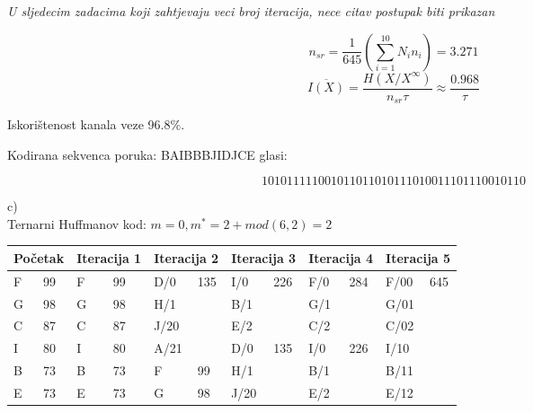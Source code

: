 \documentclass[12pt]{article}
\begin{document}
\textit{U sljedecim zadacima koji zahtjevaju veci broj iteracija, nece citav postupak biti prikazan}

$$n_{sr} = \frac{1}{645} (\sum_{i = 1}^{10} N_i n_i) = 3.271$$
$$\overline{I(X)} = \frac{H(X/X^{\infty}) }{n_{sr} \tau} \approx \frac{0.968}{\tau}$$

Iskorištenost kanala veze 96.8\%.

Kodirana sekvenca poruka: BAIBBBJIDJCE glasi:

$$101011111001011011010111010011101110010110$$

c)\\

Ternarni Huffmanov kod: $m = 0, m^{*} = 2 + mod(6, 2) = 2$

\begin{table}[hp]
\centering
\begin{tabular}{|l|l|l|l|l|l|l|l|l|l|l|l|}
\hline
\multicolumn{2}{|l|}{Početak} & \multicolumn{2}{l|}{Iteracija 1} & \multicolumn{2}{l|}{Iteracija 2} & \multicolumn{2}{l|}{Iteracija 3} & \multicolumn{2}{l|}{Iteracija 4} & \multicolumn{2}{l|}{Iteracija 5} \\ \hline
F             & 99            & F       & 99                     & D/0     & \multirow{4}{*}{135}   & I/0     & \multirow{3}{*}{226}   & F/0     & \multirow{3}{*}{284}   & F/00    & \multirow{10}{*}{645}  \\ \cline{1-4}
G             & 98            & G       & 98                     & H/1     &                        & B/1     &                        & G/1     &                        & G/01    &                        \\ \cline{1-4}
C             & 87            & C       & 87                     & J/20    &                        & E/2     &                        & C/2     &                        & C/02    &                        \\ \cline{1-4} \cline{7-10}
I             & 80            & I       & 80                     & A/21    &                        & D/0     & \multirow{4}{*}{135}   & I/0     & \multirow{3}{*}{226}   & I/10    &                        \\ \cline{1-6}
B             & 73            & B       & 73                     & F       & 99                     & H/1     &                        & B/1     &                        & B/11    &                        \\ \cline{1-6}
E             & 73            & E       & 73                     & G       & 98                     & J/20    &                        & E/2     &                        & E/12    &                        \\ \cline{1-6} \cline{9-10}

\end{tabular}
\end{table}
\end{document}
